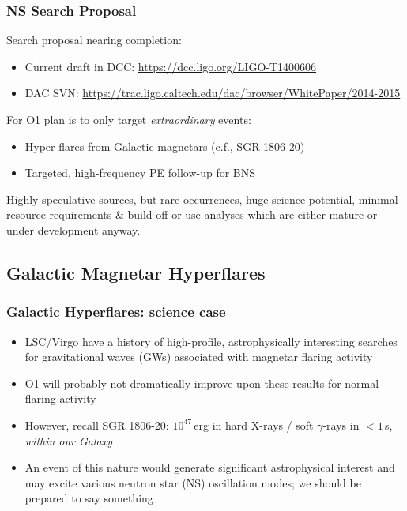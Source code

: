 \documentclass{beamer}
\def\gw#1{gravitational wave#1 (GW#1)\gdef\gw{GW}}
\def\ns#1{neutron star#1 (NS#1)\gdef\ns{NS}}
\begin{document}
\begin{frame}
    \frametitle{NS Search Proposal}
    Search proposal nearing completion:
    \begin{itemize}
        \item Current draft in DCC: {\small \href{https://dcc.ligo.org/LIGO-T1400606}{https://dcc.ligo.org/LIGO-T1400606}}
        \item DAC SVN:
            {\small \href{https://trac.ligo.caltech.edu/dac/browser/WhitePaper/2014-2015}
            {https://trac.ligo.caltech.edu/dac/browser/WhitePaper/2014-2015}}
    \end{itemize}
    For O1 plan is to only target \emph{extraordinary} events:
    \begin{itemize}
        \item Hyper-flares from Galactic magnetars (c.f., SGR 1806-20)
        \item Targeted, high-frequency PE follow-up for BNS
    \end{itemize}
    Highly speculative sources, but rare occurrences, huge
    science potential, minimal resource requirements \& build off or use
    analyses which are either mature or under development anyway.
\end{frame}

\subsection{Galactic Magnetar Hyperflares}
\begin{frame}
    \frametitle{Galactic Hyperflares: science case}
    \begin{itemize}
        \item LSC/Virgo have a history of high-profile, astrophysically interesting
            searches for \gw{s} associated with magnetar flaring activity

        \item O1 will probably not dramatically improve upon these results for
            normal flaring activity

        \item However, recall SGR 1806-20: $10^{47}$\,erg in hard X-rays / soft $\gamma$-rays in
            $<1$\,s, \emph{within our Galaxy}

        \item An event of this nature would generate significant astrophysical
            interest and may excite various \ns{} oscillation modes; we
            should be prepared to say something
    \end{itemize}
\end{frame}
\end{document}
